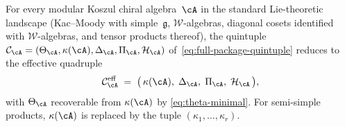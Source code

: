 \begin{corollary}
\label{cor:effective-quadruple}
For every modular Koszul chiral algebra~$\cA$ in the
standard Lie-theoretic landscape
\textup{(}Kac--Moody with simple~$\mathfrak{g}$,
$\mathcal{W}$-algebras, diagonal cosets identified with
$\mathcal{W}$-algebras, and tensor products thereof\textup{)},
the quintuple
$\mathcal{C}_{\cA} = (\Theta_{\cA}, \kappa(\cA),
\Delta_{\cA}, \Pi_{\cA}, \mathcal{H}_{\cA})$
of~\eqref{eq:full-package-quintuple} reduces to the effective
quadruple
\begin{equation}\label{eq:reduced-quadruple}
\mathcal{C}_{\cA}^{\mathrm{eff}}
\;=\; \bigl(\,\kappa(\cA),\;\Delta_{\cA},\;
       \Pi_{\cA},\;\mathcal{H}_{\cA}\,\bigr),
\end{equation}
with $\Theta_{\cA}$ recoverable from $\kappa(\cA)$ by
\eqref{eq:theta-minimal}.  For semi-simple products,
$\kappa(\cA)$ is replaced by the tuple
$(\kappa_1, \ldots, \kappa_r)$.
\end{corollary}

